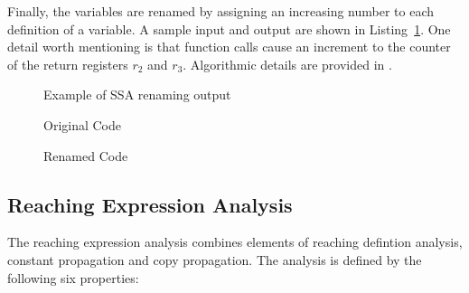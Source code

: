 	Finally, the variables are renamed by assigning an increasing number to each definition of a variable. 
	A sample input and output are shown in Listing~\ref{l:ssa-example}. One detail worth mentioning is that function calls cause an increment to the counter of the return registers $r_2$ and $r_3$.
	Algorithmic details are provided in \cite{andrew2002modern}.
	

\begin{figure}[h]
\captionsetup{type=lstlisting}
\caption{Example of SSA renaming output}
\begin{sublstlisting}[t]{0.47\linewidth}
\caption{Original Code}

\end{sublstlisting} \hfill
\begin{sublstlisting}[t]{0.47\linewidth}
\caption{Renamed Code}

\end{sublstlisting}
\label{l:ssa-example}
\end{figure}




\subsection{Reaching Expression Analysis}

The reaching expression analysis combines elements of reaching defintion analysis, constant propagation and copy propagation. The analysis is defined by the following six properties:

